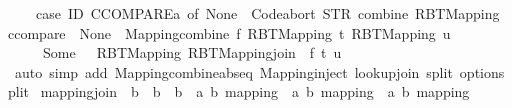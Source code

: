 \begin{isabellebody}
\ \ \ \ {\isacharparenleft}{\kern0pt}case\ ID\ CCOMPARE{\isacharparenleft}{\kern0pt}{\isacharprime}{\kern0pt}a{\isacharparenright}{\kern0pt}\ of\ None\ {\isasymRightarrow}\ Code{\isachardot}{\kern0pt}abort\ {\isacharparenleft}{\kern0pt}STR\ {\isacharprime}{\kern0pt}{\isacharprime}{\kern0pt}combine\ RBT{\isacharunderscore}{\kern0pt}Mapping{\isacharcolon}{\kern0pt}\ ccompare\ {\isacharequal}{\kern0pt}\ None{\isacharprime}{\kern0pt}{\isacharprime}{\kern0pt}{\isacharparenright}{\kern0pt}\ {\isacharparenleft}{\kern0pt}{\isasymlambda}{\isacharunderscore}{\kern0pt}{\isachardot}{\kern0pt}\ Mapping{\isachardot}{\kern0pt}combine\ f\ {\isacharparenleft}{\kern0pt}RBT{\isacharunderscore}{\kern0pt}Mapping\ t{\isacharparenright}{\kern0pt}\ {\isacharparenleft}{\kern0pt}RBT{\isacharunderscore}{\kern0pt}Mapping\ u{\isacharparenright}{\kern0pt}{\isacharparenright}{\kern0pt}\isanewline
\ \ \ \ {\isacharbar}{\kern0pt}\ Some\ {\isacharunderscore}{\kern0pt}\ {\isasymRightarrow}\ RBT{\isacharunderscore}{\kern0pt}Mapping\ {\isacharparenleft}{\kern0pt}RBT{\isacharunderscore}{\kern0pt}Mapping{}{\isachardot}{\kern0pt}join\ {\isacharparenleft}{\kern0pt}{\isasymlambda}{\isacharunderscore}{\kern0pt}{\isachardot}{\kern0pt}\ f{\isacharparenright}{\kern0pt}\ t\ u{\isacharparenright}{\kern0pt}{\isacharparenright}{\kern0pt}{\isachardoublequoteclose}\isanewline
%
\isadelimproof
\ \ %
\endisadelimproof
%
\isatagproof
{}\isamarkupfalse%
\ {\isacharparenleft}{\kern0pt}auto\ simp\ add{\isacharcolon}{\kern0pt}\ Mapping{\isachardot}{\kern0pt}combine{\isachardot}{\kern0pt}abs{\isacharunderscore}{\kern0pt}eq\ Mapping{\isacharunderscore}{\kern0pt}inject\ lookup{\isacharunderscore}{\kern0pt}join\ split{\isacharcolon}{\kern0pt}\ option{\isachardot}{\kern0pt}split{\isacharparenright}{\kern0pt}%
\endisatagproof
{\isafoldproof}%
%
\isadelimproof
\isanewline
%
\endisadelimproof
\isanewline
{}\isamarkupfalse%
\ mapping{\isacharunderscore}{\kern0pt}join\ {\isacharcolon}{\kern0pt}{\isacharcolon}{\kern0pt}\ {\isachardoublequoteopen}{\isacharparenleft}{\kern0pt}{\isacharprime}{\kern0pt}b\ {\isasymRightarrow}\ {\isacharprime}{\kern0pt}b\ {\isasymRightarrow}\ {\isacharprime}{\kern0pt}b{\isacharparenright}{\kern0pt}\ {\isasymRightarrow}\ {\isacharparenleft}{\kern0pt}{\isacharprime}{\kern0pt}a{\isacharcomma}{\kern0pt}\ {\isacharprime}{\kern0pt}b{\isacharparenright}{\kern0pt}\ mapping\ {\isasymRightarrow}\ {\isacharparenleft}{\kern0pt}{\isacharprime}{\kern0pt}a{\isacharcomma}{\kern0pt}\ {\isacharprime}{\kern0pt}b{\isacharparenright}{\kern0pt}\ mapping\ {\isasymRightarrow}\ {\isacharparenleft}{\kern0pt}{\isacharprime}{\kern0pt}a{\isacharcomma}{\kern0pt}\ {\isacharprime}{\kern0pt}b{\isacharparenright}{\kern0pt}\ mapping{\isachardoublequoteclose}\ \isanewline

\end{isabellebody}
